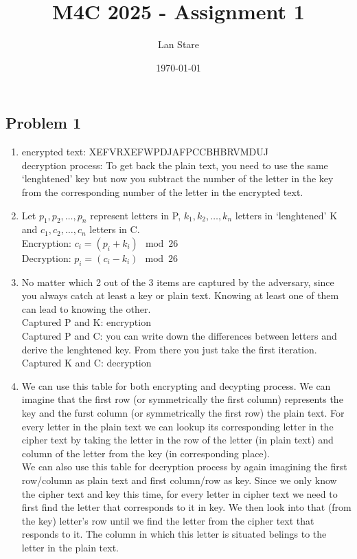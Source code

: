 \documentclass[a4paper,10pt]{article}
\title{M4C 2025 \--  Assignment 1}
\author{Lan Stare}
\date{\today}
\begin{document}
\maketitle

\subsection*{Problem 1}
 
\begin{enumerate}[label= (\alph*)]

 \item encrypted text: XEFVRXEFWPDJAFPCCBHBRVMDUJ\\
 decryption process: To get back the plain text, you need to use the same `lenghtened' key but now you subtract the number of the letter in the key from the corresponding number of the letter in the encrypted text.

 \item Let $p_1, p_2, \ldots, p_n$ represent letters in P,  $k_1, k_2, \ldots, k_n$ letters in `lenghtened' K and $c_1, c_2, \ldots, c_n$ letters in C.\\
 Encryption: $c_i = (p_i + k_i)\mod26$\\
 Decryption: $p_i = (c_i - k_i)\mod26$
 \item No matter which 2 out of the 3 items are captured by the adversary, since you always catch at least a key or plain text. Knowing at least one of them can lead to knowing the other.\\
 Captured P and K: encryption\\
 Captured P and C: you can write down the differences between letters and derive the lenghtened key. From there you just take the first iteration.\\
 Captured K and C: decryption

 \item We can use this table for both encrypting and decypting process. We can imagine that the first row (or symmetrically the first column) represents the key and the furst column (or symmetrically the first row) the plain text. For every letter in the plain text we can lookup its corresponding letter in the cipher text by taking the letter in the row of the letter (in plain text) and column of the letter from the key (in corresponding place).\\
 We can also use this table for decryption process by again imagining the first row/column as plain text and first column/row as key. Since we only know the cipher text and key this time, for every letter in cipher text we need to first find the letter that corresponds to it in key. We then look into that (from the key) letter's row until we find the letter from the cipher text that responds to it. The column in which this letter is situated belings to the letter in the plain text.

\end{enumerate}
\end{document}
